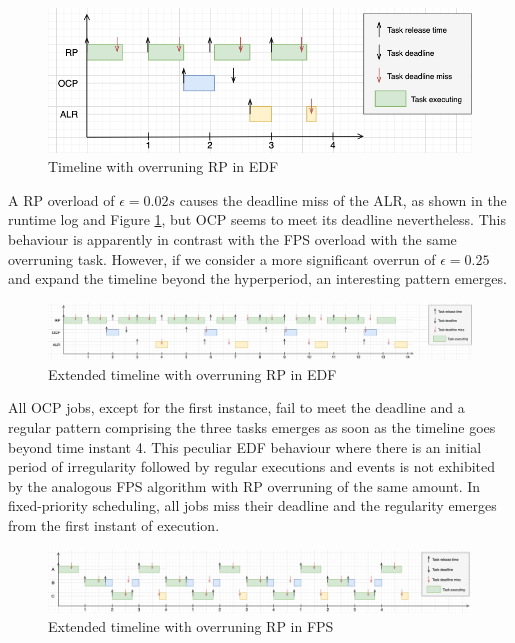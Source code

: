 \documentclass{article}
\begin{document}
\begin{figure}[!htbp]
\centering
\includegraphics[width=6.5in]{images/timeline-overload-edf-rp}
\caption{Timeline with overruning RP in EDF}
\label{timeline-overload-edf-rp}
\end{figure}

A RP overload of $\epsilon = 0.02s$ causes the deadline miss of the ALR, as shown in the runtime log and Figure \ref{timeline-overload-edf-rp}, but OCP seems to meet its deadline nevertheless. This behaviour is apparently in contrast with the FPS overload with the same overruning task. However, if we consider a more significant overrun of $\epsilon = 0.25$ and expand the timeline beyond the hyperperiod, an interesting pattern emerges.

\begin{figure}[!htbp]
\centering
\includegraphics[width=6.5in]{images/timeline-overload-edf-extended}
\caption{Extended timeline with overruning RP in EDF}
\label{timeline-overload-edf-extended}
\end{figure}

All OCP jobs, except for the first instance, fail to meet the deadline and a regular pattern comprising the three tasks emerges as soon as the timeline goes beyond time instant 4. This peculiar EDF behaviour where there is an initial period of irregularity followed by regular executions and events is not exhibited by the analogous FPS algorithm with RP overruning of the same amount. In fixed-priority scheduling, all jobs miss their deadline and the regularity emerges from the first instant of execution.

\begin{figure}[!htbp]
\centering
\includegraphics[width=6.5in]{images/timeline-overload-fps-extended}
\caption{Extended timeline with overruning RP in FPS}
\label{timeline-overload-fps-extended}
\end{figure}
\end{document}
